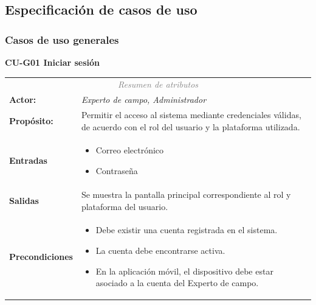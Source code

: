 \newpage
\subsection{Especificación de casos de uso}
\subsubsection{Casos de uso generales}
\textbf{CU-G01 Iniciar sesión}
\begin{table}[H]
\centering
\renewcommand{\arraystretch}{1.2}

\begin{tabular}{|l|p{10cm}|}
\hline
\rowcolor{black}
\multicolumn{2}{|l|}{\color{white} \textbf{Caso de uso:} CU-G01 Iniciar sesión} \\ \hline

\multicolumn{2}{|c|}{\textit{\textcolor{gray}{Resumen de atributos}}} \\ \hline

\textbf{Actor:} & \textit{Experto de campo, Administrador} \\ \hline

\textbf{Propósito:} & Permitir el acceso al sistema mediante credenciales válidas, de acuerdo con el rol del usuario y la plataforma utilizada. \\ \hline

\textbf{Entradas} & 
\begin{itemize}
    \item Correo electrónico
    \item Contraseña
\end{itemize} \\ \hline

\textbf{Salidas} & 
Se muestra la pantalla principal correspondiente al rol y plataforma del usuario. \\ \hline

\textbf{Precondiciones} & 
\begin{itemize}
    \item Debe existir una cuenta registrada en el sistema.
    \item La cuenta debe encontrarse activa.
    \item En la aplicación móvil, el dispositivo debe estar asociado a la cuenta del Experto de campo.
\end{itemize} \\ \hline


\end{tabular}
\end{table}
